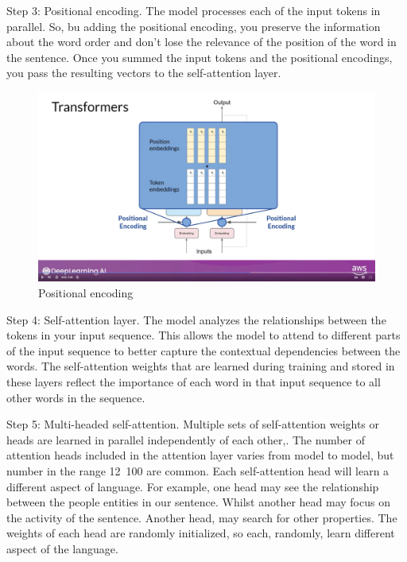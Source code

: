 \documentclass[12pt]{report}
\begin{document}
Step 3: Positional encoding. The model processes each of the input tokens in parallel. So, bu adding the positional encoding, you preserve the information about the word order and don't lose the relevance of the position of the word in the sentence. Once you summed the input tokens and the positional encodings, you pass the resulting vectors to the self-attention layer.

\begin{figure}[H]
  \centering
  \caption{Positional encoding}
  \includegraphics[trim=3cm 7cm 5cm 0cm,clip,scale=0.15]{pics/positional.png}
\end{figure}


Step 4: Self-attention layer. The model analyzes the relationships between the tokens in your input sequence. This allows the model to attend to different parts of the input sequence to better capture the contextual dependencies between the words. The self-attention weights  that are learned during training and stored in these layers reflect the importance of each word in that input sequence to all other words in the sequence.


Step 5: Multi-headed self-attention. Multiple sets of self-attention weights or heads are learned in parallel independently of each other,. The number of attention heads included in the attention layer varies from model to model, but number in the range 12~100 are common. Each self-attention head will learn a different aspect of language. For example, one head may see the relationship between the people entities in our sentence. Whilst another head may focus on the activity of the sentence. Another head, may search for other properties. The weights of each head are randomly initialized, so each, randomly, learn different aspect of the language.
\end{document}
